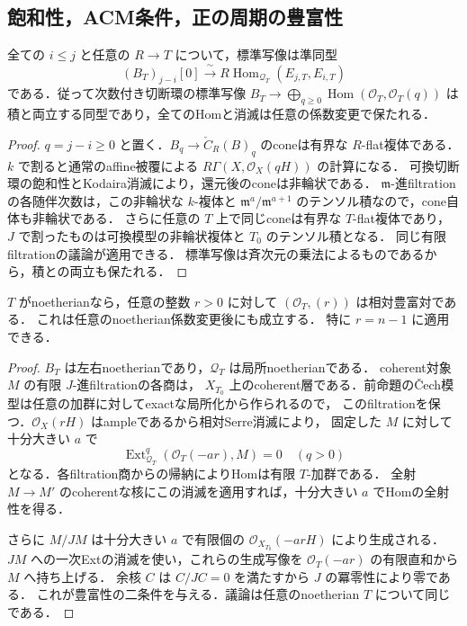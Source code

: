 \subsection{飽和性，ACM条件，正の周期の豊富性}
\begin{theorem}[普遍的な有向ACMとsection復元]
\label{thm:artin-saturation-acm}
全ての $i\le j$ と任意の $R\to T$ について，標準写像は準同型
\[
 (B_T)_{j-i}[0]\xrightarrow{\ \sim\ }
 R\operatorname{Hom}_{\mathcal Q_T}(E_{j,T},E_{i,T})
\]
である．従って次数付き切断環の標準写像
$B_T\to\bigoplus_{q\ge0}\operatorname{Hom}(\mathcal O_T,\mathcal O_T(q))$
は積と両立する同型であり，全てのHomと消滅は任意の係数変更で保たれる．
\end{theorem}
\begin{proof}
$q=j-i\ge0$ と置く．$B_q\to\check C_R(B)_q$ のconeは有界な $R$-flat複体である．
$k$ で割ると通常のaffine被覆による $R\Gamma(X,\mathcal O_X(qH))$ の計算になる．
可換切断環の飽和性とKodaira消滅により，還元後のconeは非輪状である．
$\mathfrak m$-進filtrationの各随伴次数は，この非輪状な $k$-複体と
$\mathfrak m^a/\mathfrak m^{a+1}$ のテンソル積なので，cone自体も非輪状である．
さらに任意の $T$ 上で同じconeは有界な $T$-flat複体であり，
$J$ で割ったものは可換模型の非輪状複体と $T_0$ のテンソル積となる．
同じ有限filtrationの議論が適用できる．
標準写像は斉次元の乗法によるものであるから，積との両立も保たれる．
\end{proof}

\begin{theorem}[任意の正周期の相対豊富性]
\label{thm:artin-positive-shift-ample}
$T$ がnoetherianなら，任意の整数 $r>0$ に対して
$(\mathcal O_T,(r))$ は相対豊富対である．
これは任意のnoetherian係数変更後にも成立する．
特に $r=n-1$ に適用できる．
\end{theorem}
\begin{proof}
$B_T$ は左右noetherianであり，$\mathcal Q_T$ は局所noetherianである．
coherent対象 $M$ の有限 $J$-進filtrationの各商は，
$X_{T_0}$ 上のcoherent層である．前命題の\v{C}ech模型は任意の加群に対してexactな局所化から作られるので，
このfiltrationを保つ．$\mathcal O_X(rH)$ はampleであるから相対Serre消滅により，
固定した $M$ に対して十分大きい $a$ で
\[
 \operatorname{Ext}^q_{\mathcal Q_T}(\mathcal O_T(-ar),M)=0
 \quad(q>0)
\]
となる．各filtration商からの帰納によりHomは有限 $T$-加群である．
全射 $M\to M'$ のcoherentな核にこの消滅を適用すれば，十分大きい $a$ でHomの全射性を得る．

さらに $M/JM$ は十分大きい $a$ で有限個の $\mathcal O_{X_{T_0}}(-arH)$ により生成される．
$JM$ への一次Extの消滅を使い，これらの生成写像を
$\mathcal O_T(-ar)$ の有限直和から $M$ へ持ち上げる．
余核 $C$ は $C/JC=0$ を満たすから $J$ の冪零性により零である．
これが豊富性の二条件を与える．議論は任意のnoetherian $T$ について同じである．
\end{proof}

